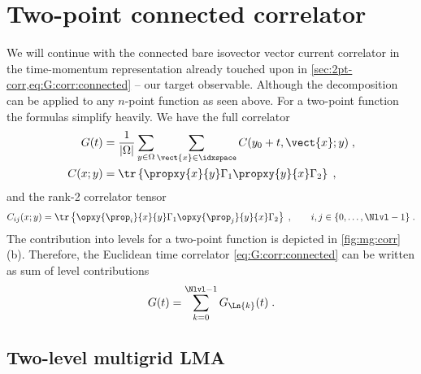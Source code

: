 \section{Two-point connected correlator}
\label{sec:mg:2pt}

We will continue with the connected bare isovector vector current correlator in the time-momentum representation already touched upon in \cref{sec:2pt-corr,eq:G:corr:connected} -- our target observable.
Although the decomposition can be applied to any $n$-point function as seen above.
For a two-point function the formulas simplify heavily.
We have the full correlator
\begin{align} \label{eq:2pt:G}
G(t) &= \frac{1}{\lvert \Omega \rvert} \sum_{y \in \Omega} \sum_{\vect{x} \in \idxspace} C(y_0+t, \vect{x} ; y) \;,
\\
C(x; y) &= \tr \left\{ \propxy{x}{y} \Gamma_1 \propxy{y}{x} \Gamma_2 \right\} \;,
\end{align}
and the rank-2 correlator tensor
\begin{equation} \label{eq:Cij}
C_{ij}(x; y) = \tr \left\{ \opxy{\prop_{i}}{x}{y} \Gamma_1 \opxy{\prop_{j}}{y}{x} \Gamma_2 \right\} \;,
\qquad i,j \in \{0, \ldots, \Nlvl-1\} \;.
\end{equation}
The contribution into levels for a two-point function is depicted in \cref{fig:mg:corr} (b).
Therefore, the Euclidean time correlator \cref{eq:G:corr:connected} can be written as sum of level contributions
\begin{align}
G(t) = \sum_{k=0}^{\Nlvl-1} G_{\Ln{k}}(t) \;.
\end{align}

\subsection{Two-level multigrid LMA}

